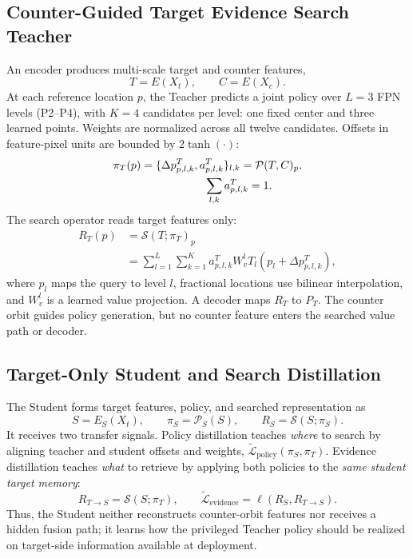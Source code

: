 \subsection{Counter-Guided Target Evidence Search Teacher}
An encoder produces multi-scale target and counter features,
\begin{equation}
T=E(X_t), \qquad C=E(X_c).
\label{eq:teacher_features}
\end{equation}
At each reference location $p$, the Teacher predicts a joint policy over $L=3$ FPN levels (P2--P4), with $K=4$ candidates per level: one fixed center and three learned points. Weights are normalized across all twelve candidates. Offsets in feature-pixel units are bounded by $2\tanh(\cdot)$:
\begin{equation}
\begin{aligned}
\pi_T(p)&=\{\Delta p^T_{p,l,k},a^T_{p,l,k}\}_{l,k}=\mathcal{P}(T,C)_p,\\
&\hspace{20mm}\sum_{l,k} a^T_{p,l,k}=1.
\end{aligned}
\label{eq:teacher_policy}
\end{equation}
The search operator reads target features only:
\begin{equation}
\begin{aligned}
R_T(p)&=\mathcal{S}(T;\pi_T)_p\\
&=\sum_{l=1}^{L}\sum_{k=1}^{K}a^T_{p,l,k}W_v^{l}T_l(p_l+\Delta p^T_{p,l,k}),
\end{aligned}
\label{eq:teacher_search}
\end{equation}
where $p_l$ maps the query to level $l$, fractional locations use bilinear interpolation, and $W_v^l$ is a learned value projection. A decoder maps $R_T$ to $P_T$. The counter orbit guides policy generation, but no counter feature enters the searched value path or decoder.

\subsection{Target-Only Student and Search Distillation}
The Student forms target features, policy, and searched representation as
\begin{equation}
S=E_S(X_t), \qquad \pi_S=\mathcal{P}_S(S), \qquad R_S=\mathcal{S}(S;\pi_S).
\label{eq:student_search}
\end{equation}
It receives two transfer signals. Policy distillation teaches \emph{where} to search by aligning teacher and student offsets and weights, $\widetilde{\mathcal{L}}_{\mathrm{policy}}(\pi_S,\pi_T)$. Evidence distillation teaches \emph{what} to retrieve by applying both policies to the \emph{same student target memory}:
\begin{equation}
R_{T\rightarrow S}=\mathcal{S}(S;\pi_T), \qquad
\widetilde{\mathcal{L}}_{\mathrm{evidence}}=\ell(R_S,R_{T\rightarrow S}).
\label{eq:shared_memory}
\end{equation}
Thus, the Student neither reconstructs counter-orbit features nor receives a hidden fusion path; it learns how the privileged Teacher policy should be realized on target-side information available at deployment.

